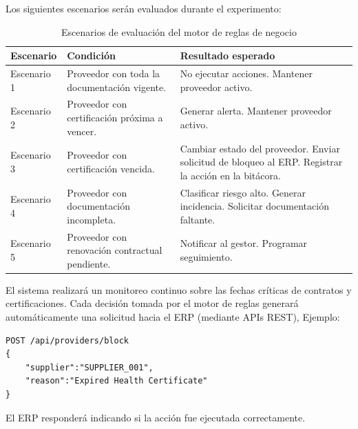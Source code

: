 \documentclass[12pt]{article}
\begin{document}
Los siguientes escenarios serán evaluados durante el experimento:

\begin{table}[htbp]
\centering
\caption{Escenarios de evaluación del motor de reglas de negocio}
\vspace{0.3cm}
\label{tab:escenarios-motor-reglas}
\renewcommand{\arraystretch}{1.2}
\begin{tabularx}{\textwidth}{|p{2.6cm}|>{\raggedright\arraybackslash}X|>{\raggedright\arraybackslash}X|}
\hline
\textbf{Escenario} & \textbf{Condición} & \textbf{Resultado esperado} \\
\hline
Escenario 1 & Proveedor con toda la documentación vigente. & No ejecutar acciones. \newline Mantener proveedor activo. \\
\hline
Escenario 2 & Proveedor con certificación próxima a vencer. & Generar alerta. \newline Mantener proveedor activo. \\
\hline
Escenario 3 & Proveedor con certificación vencida. & Cambiar estado del proveedor. \newline Enviar solicitud de bloqueo al ERP. \newline Registrar la acción en la bitácora. \\
\hline
Escenario 4 & Proveedor con documentación incompleta. & Clasificar riesgo alto. \newline Generar incidencia. \newline Solicitar documentación faltante. \\
\hline
Escenario 5 & Proveedor con renovación contractual pendiente. & Notificar al gestor. \newline Programar seguimiento. \\
\hline
\end{tabularx}
\end{table}

El sistema realizará un monitoreo continuo sobre las fechas críticas de contratos y certificaciones. Cada decisión tomada por el motor de reglas generará automáticamente una solicitud hacia el ERP (mediante APIs REST), Ejemplo:

\begin{verbatim}
POST /api/providers/block
{
    "supplier":"SUPPLIER_001",
    "reason":"Expired Health Certificate"
}
\end{verbatim}

El ERP responderá indicando si la acción fue ejecutada correctamente.
\end{document}
